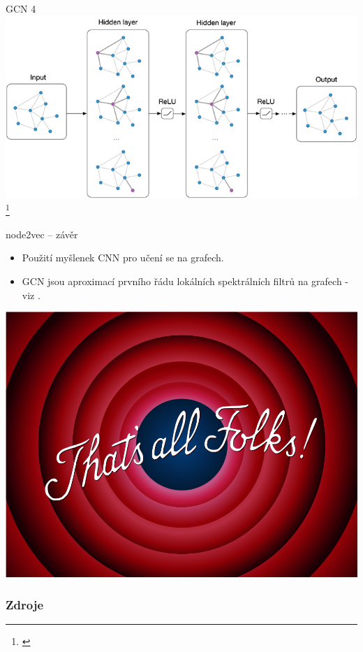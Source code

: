 \documentclass[10pt]{beamer}
\begin{document}
\begin{frame}{GCN 4}
	\centering
	\includegraphics[width=0.8\pagewidth]{images/GCN.png}\footnote{\cite{kipf_how_2016}}
\end{frame}

\begin{frame}{node2vec -- závěr}
	\begin{itemize}
		\item Použití myšlenek CNN pro učení se na grafech.
		\item GCN jsou aproximací prvního řádu lokálních spektrálních filtrů na grafech - viz \cite{kipf_semi-supervised_2017}.
	\end{itemize}
\end{frame}

\begin{frame}
	\centering
	\includegraphics[width=0.75\pagewidth]{images/thats-all.png}
\end{frame}

\begin{frame}[allowframebreaks]
	\frametitle{Zdroje}
	\printbibliography
\end{frame}
\end{document}

